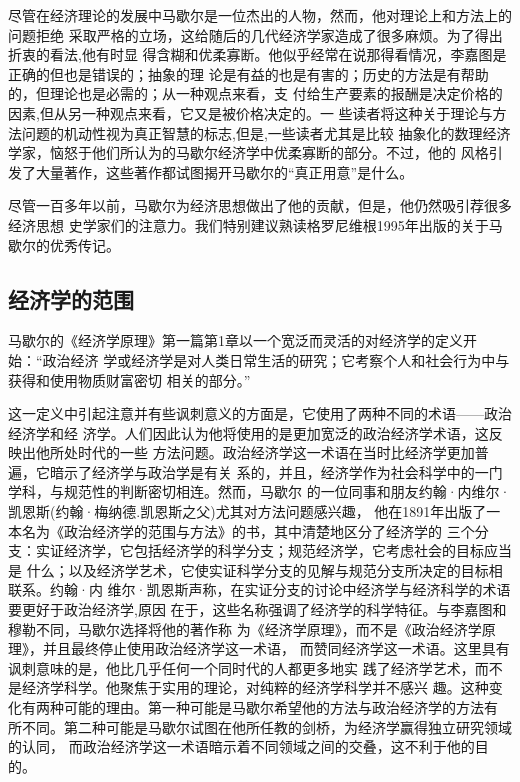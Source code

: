 尽管在经济理论的发展中马歇尔是一位杰出的人物，然而，他对理论上和方法上的问题拒绝
采取严格的立场，这给随后的几代经济学家造成了很多麻烦。为了得出折衷的看法,他有时显
得含糊和优柔寡断。他似乎经常在说那得看情况，李嘉图是正确的但也是错误的；抽象的理
论是有益的也是有害的；历史的方法是有帮助的，但理论也是必需的；从一种观点来看，支
付给生产要素的报酬是决定价格的因素,但从另一种观点来看，它又是被价格决定的。一
些读者将这种关于理论与方法问题的机动性视为真正智慧的标志,但是,一些读者尤其是比较
抽象化的数理经济学家，恼怒于他们所认为的马歇尔经济学中优柔寡断的部分。不过，他的
风格引发了大量著作，这些著作都试图揭开马歇尔的“真正用意”是什么。

尽管一百多年以前，马歇尔为经济思想做出了他的贡献，但是，他仍然吸引荐很多经济思想
史学家们的注意力。我们特别建议熟读格罗尼维根1995年出版的关于马歇尔的优秀传记。

\subsection{经济学的范围}

马歇尔的《经济学原理》第一篇第1章以一个宽泛而灵活的对经济学的定义开始：“政治经济
学或经济学是对人类日常生活的研究；它考察个人和社会行为中与获得和使用物质财富密切
相关的部分。”

这一定义中引起注意并有些讽刺意义的方面是，它使用了两种不同的术语——政治经济学和经
济学。人们因此认为他将使用的是更加宽泛的政治经济学术语，这反映出他所处时代的一些
方法问题。政治经济学这一术语在当时比经济学更加普遍，它暗示了经济学与政治学是有关
系的，并且，经济学作为社会科学中的一门学科，与规范性的判断密切相连。然而，马歇尔
的一位同事和朋友约翰·内维尔·凯恩斯(约翰·梅纳德.凯恩斯之父)尤其对方法问题感兴趣，
他在1891年出版了一本名为《政治经济学的范围与方法》的书，其中清楚地区分了经济学的
三个分支：实证经济学，它包括经济学的科学分支；规范经济学，它考虑社会的目标应当是
什么；以及经济学艺术，它使实证科学分支的见解与规范分支所决定的目标相联系。约翰·内
维尔·凯恩斯声称，在实证分支的讨论中经济学与经济科学的术语要更好于政治经济学,原因
在于，这些名称强调了经济学的科学特征。与李嘉图和穆勒不同，马歇尔选择将他的著作称
为《经济学原理》，而不是《政治经济学原理》，并且最终停止使用政治经济学这一术语，
而赞同经济学这一术语。这里具有讽刺意味的是，他比几乎任何一个同时代的人都更多地实
践了经济学艺术，而不是经济学科学。他聚焦于实用的理论，对纯粹的经济学科学并不感兴
趣。这种变化有两种可能的理由。第一种可能是马歇尔希望他的方法与政治经济学的方法有
所不同。第二种可能是马歇尔试图在他所任教的剑桥，为经济学赢得独立研究领域的认同，
而政治经济学这一术语暗示着不同领域之间的交叠，这不利于他的目的。

